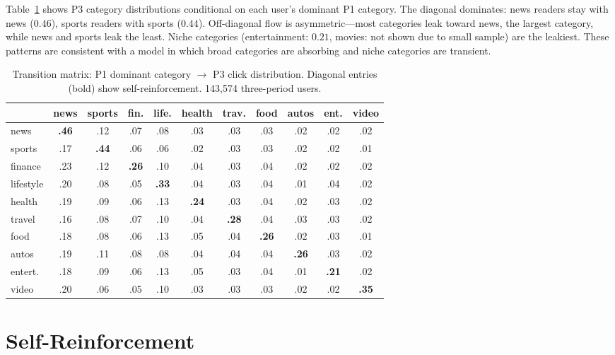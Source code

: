\documentclass[11pt]{article}
\begin{document}
Table~\ref{tab:transition} shows P3 category distributions conditional on each user's dominant P1 category. The diagonal dominates: news readers stay with news ($0.46$), sports readers with sports ($0.44$). Off-diagonal flow is asymmetric---most categories leak toward news, the largest category, while news and sports leak the least. Niche categories (entertainment: $0.21$, movies: not shown due to small sample) are the leakiest. These patterns are consistent with a model in which broad categories are absorbing and niche categories are transient.

\begin{table}[ht]
\centering
\caption{Transition matrix: P1 dominant category $\to$ P3 click distribution. Diagonal entries (bold) show self-reinforcement. 143,574 three-period users.}
\label{tab:transition}
\small
\setlength{\tabcolsep}{3.5pt}
\begin{tabular}{l|cccccccccc}
\toprule
& news & sports & fin. & life. & health & trav. & food & autos & ent. & video \\
\midrule
news & \textbf{.46} & .12 & .07 & .08 & .03 & .03 & .03 & .02 & .02 & .02 \\
sports & .17 & \textbf{.44} & .06 & .06 & .02 & .03 & .03 & .02 & .02 & .01 \\
finance & .23 & .12 & \textbf{.26} & .10 & .04 & .03 & .04 & .02 & .02 & .02 \\
lifestyle & .20 & .08 & .05 & \textbf{.33} & .04 & .03 & .04 & .01 & .04 & .02 \\
health & .19 & .09 & .06 & .13 & \textbf{.24} & .03 & .04 & .02 & .03 & .02 \\
travel & .16 & .08 & .07 & .10 & .04 & \textbf{.28} & .04 & .03 & .03 & .02 \\
food & .18 & .08 & .06 & .13 & .05 & .04 & \textbf{.26} & .02 & .03 & .01 \\
autos & .19 & .11 & .08 & .08 & .04 & .04 & .04 & \textbf{.26} & .03 & .02 \\
entert. & .18 & .09 & .06 & .13 & .05 & .03 & .04 & .01 & \textbf{.21} & .02 \\
video & .20 & .06 & .05 & .10 & .03 & .03 & .03 & .02 & .02 & \textbf{.35} \\
\bottomrule
\end{tabular}
\end{table}

\section{Self-Reinforcement}
\end{document}
